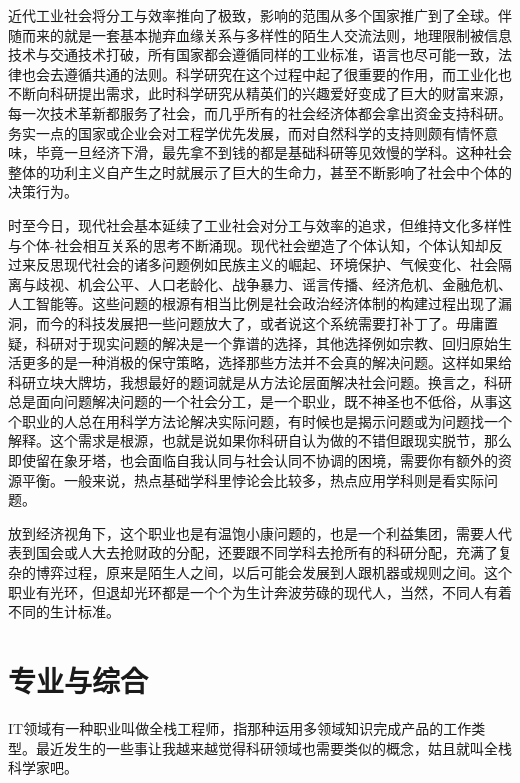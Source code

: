 \documentclass[]{tufte-book}
\begin{document}
近代工业社会将分工与效率推向了极致，影响的范围从多个国家推广到了全球。伴随而来的就是一套基本抛弃血缘关系与多样性的陌生人交流法则，地理限制被信息技术与交通技术打破，所有国家都会遵循同样的工业标准，语言也尽可能一致，法律也会去遵循共通的法则。科学研究在这个过程中起了很重要的作用，而工业化也不断向科研提出需求，此时科学研究从精英们的兴趣爱好变成了巨大的财富来源，每一次技术革新都服务了社会，而几乎所有的社会经济体都会拿出资金支持科研。务实一点的国家或企业会对工程学优先发展，而对自然科学的支持则颇有情怀意味，毕竟一旦经济下滑，最先拿不到钱的都是基础科研等见效慢的学科。这种社会整体的功利主义自产生之时就展示了巨大的生命力，甚至不断影响了社会中个体的决策行为。

时至今日，现代社会基本延续了工业社会对分工与效率的追求，但维持文化多样性与个体-社会相互关系的思考不断涌现。现代社会塑造了个体认知，个体认知却反过来反思现代社会的诸多问题例如民族主义的崛起、环境保护、气候变化、社会隔离与歧视、机会公平、人口老龄化、战争暴力、谣言传播、经济危机、金融危机、人工智能等。这些问题的根源有相当比例是社会政治经济体制的构建过程出现了漏洞，而今的科技发展把一些问题放大了，或者说这个系统需要打补丁了。毋庸置疑，科研对于现实问题的解决是一个靠谱的选择，其他选择例如宗教、回归原始生活更多的是一种消极的保守策略，选择那些方法并不会真的解决问题。这样如果给科研立块大牌坊，我想最好的题词就是从方法论层面解决社会问题。换言之，科研总是面向问题解决问题的一个社会分工，是一个职业，既不神圣也不低俗，从事这个职业的人总在用科学方法论解决实际问题，有时候也是揭示问题或为问题找一个解释。这个需求是根源，也就是说如果你科研自认为做的不错但跟现实脱节，那么即使留在象牙塔，也会面临自我认同与社会认同不协调的困境，需要你有额外的资源平衡。一般来说，热点基础学科里悖论会比较多，热点应用学科则是看实际问题。

放到经济视角下，这个职业也是有温饱小康问题的，也是一个利益集团，需要人代表到国会或人大去抢财政的分配，还要跟不同学科去抢所有的科研分配，充满了复杂的博弈过程，原来是陌生人之间，以后可能会发展到人跟机器或规则之间。这个职业有光环，但退却光环都是一个个为生计奔波劳碌的现代人，当然，不同人有着不同的生计标准。

\hypertarget{ux4e13ux4e1aux4e0eux7efcux5408}{%
\section{专业与综合}\label{ux4e13ux4e1aux4e0eux7efcux5408}}

IT领域有一种职业叫做全栈工程师，指那种运用多领域知识完成产品的工作类型。最近发生的一些事让我越来越觉得科研领域也需要类似的概念，姑且就叫全栈科学家吧。
\end{document}
